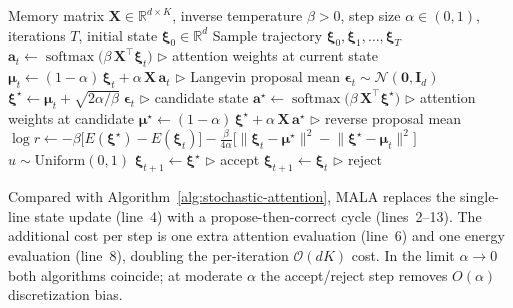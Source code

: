 \begin{algorithm}[h]
\caption{MALA Stochastic Attention Sampler}\label{alg:mala}
\begin{algorithmic}[1]
\REQUIRE Memory matrix $\mathbf{X}\in\mathbb{R}^{d\times K}$, inverse temperature $\beta>0$, step size $\alpha\in(0,1)$, iterations $T$, initial state $\boldsymbol{\xi}_0\in\mathbb{R}^d$
\ENSURE Sample trajectory $\boldsymbol{\xi}_0,\boldsymbol{\xi}_1,\dots,\boldsymbol{\xi}_T$
    \STATE $\mathbf{a}_t \leftarrow \operatorname{softmax}\!\bigl(\beta\,\mathbf{X}^{\top}\boldsymbol{\xi}_t\bigr)$ \hfill $\triangleright$ attention weights at current state
    \STATE $\boldsymbol{\mu}_t \leftarrow (1-\alpha)\,\boldsymbol{\xi}_t + \alpha\,\mathbf{X}\,\mathbf{a}_t$ \hfill $\triangleright$ Langevin proposal mean
    \STATE $\boldsymbol{\epsilon}_t \sim \mathcal{N}(\mathbf{0},\mathbf{I}_d)$
    \STATE $\boldsymbol{\xi}^{\star} \leftarrow \boldsymbol{\mu}_t + \sqrt{2\alpha/\beta}\;\boldsymbol{\epsilon}_t$ \hfill $\triangleright$ candidate state
    \STATE $\mathbf{a}^{\star} \leftarrow \operatorname{softmax}\!\bigl(\beta\,\mathbf{X}^{\top}\boldsymbol{\xi}^{\star}\bigr)$ \hfill $\triangleright$ attention weights at candidate
    \STATE $\boldsymbol{\mu}^{\star} \leftarrow (1-\alpha)\,\boldsymbol{\xi}^{\star} + \alpha\,\mathbf{X}\,\mathbf{a}^{\star}$ \hfill $\triangleright$ reverse proposal mean
    \STATE $\log r \leftarrow -\beta\bigl[E(\boldsymbol{\xi}^{\star}) - E(\boldsymbol{\xi}_t)\bigr]
             - \frac{\beta}{4\alpha}\bigl[\lVert\boldsymbol{\xi}_t - \boldsymbol{\mu}^{\star}\rVert^2
             - \lVert\boldsymbol{\xi}^{\star} - \boldsymbol{\mu}_t\rVert^2\bigr]$
    \STATE $u \sim \mathrm{Uniform}(0,1)$
        \STATE $\boldsymbol{\xi}_{t+1} \leftarrow \boldsymbol{\xi}^{\star}$ \hfill $\triangleright$ accept
    \ELSE
        \STATE $\boldsymbol{\xi}_{t+1} \leftarrow \boldsymbol{\xi}_t$ \hfill $\triangleright$ reject
    \ENDIF
\ENDFOR
\end{algorithmic}
\end{algorithm}

Compared with Algorithm~\ref{alg:stochastic-attention}, MALA replaces the single-line state update (line~4) with a propose-then-correct cycle (lines~2--13). The additional cost per step is one extra attention evaluation (line~6) and one energy evaluation (line~8), doubling the per-iteration $\mathcal{O}(dK)$ cost. In the limit $\alpha\to 0$ both algorithms coincide; at moderate $\alpha$ the accept/reject step removes $O(\alpha)$ discretization bias.


